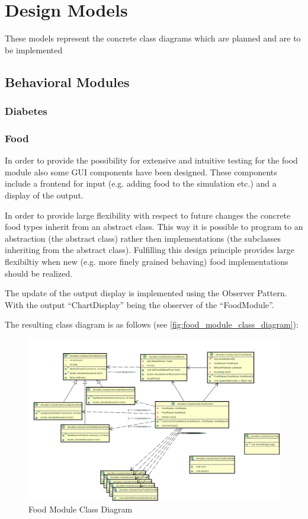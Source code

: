 \section{Design Models}
These models represent the concrete class diagrams which are planned and are to
be implemented

\subsection{Behavioral Modules}

\subsubsection{Diabetes}

\newpage
\subsubsection{Food}
In order to provide the possibility for extensive and intuitive testing for the
food module also some GUI components have been designed.
These components include a frontend for input (e.g. adding food to the
simulation etc.) and a display of the output.

In order to provide large flexibility with respect to future changes the
concrete food types inherit from an abstract class. This way it is possible to
program to an abstraction (the abstract class) rather then implementations (the
subclasses inheriting from the abstract class).
Fulfilling this design principle provides large flexibiltiy when new (e.g. more
finely grained behaving) food implementations should be realized.

The update of the output display is implemented using the Observer Pattern.
With the output ``ChartDisplay'' being the observer of the ``FoodModule''.

The resulting class diagram is as follows (see
\vref{fig:food_module_class_diagram}):

\begin{figure}[htb]
\centering
\includegraphics[width=\textwidth]{images/food_module_class_diagram.png}
\caption{Food Module Class Diagram}
\label{fig:food_module_class_diagram}
\end{figure}

